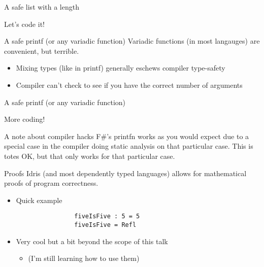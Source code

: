 \documentclass{beamer}
\begin{document}
\begin{frame}{A safe list with a length}
	\transdissolve
	\begin{center} 
		Let's code it!
	\end{center}
\end{frame}

\begin{frame}{A safe printf (or any variadic function)}
	\transdissolve
	Variadic functions (in most langauges) are convenient, but terrible.
	\begin{itemize}
	  \pause
          \item Mixing types (like in printf) generally eschews compiler type-safety
	  \pause
	  \item Compiler can't check to see if you have the correct number of arguments
	\end{itemize}
\end{frame}
\begin{frame}{A safe printf (or any variadic function)}
	\transdissolve
	\begin{center} 
	  More coding!
	\end{center}
\end{frame}
\begin{frame}{A note about compiler hacks}
 		\transdissolve
  F\#'s printfn works as you would expect due to a special case in the compiler doing static analysis on that particular case. 
  \linebreak
  \linebreak
  \pause
  This is totes OK, but that only works for that particular case.
\end{frame}
\begin{frame}[fragile]{Proofs}
 	\transdissolve
	Idris (and most dependently typed languages) allows for mathematical proofs of program correctness. 
	\begin{itemize}
		\pause
		\item Quick example
			\begin{lstlisting}
				fiveIsFive : 5 = 5
				fiveIsFive = Refl
			\end{lstlisting}

		\pause
		\item Very cool but a bit beyond the scope of this talk \begin{itemize} 
				\pause
				\item (I'm still learning how to use them)
			\end{itemize}
	\end{itemize}
\end{frame}
\end{document}
